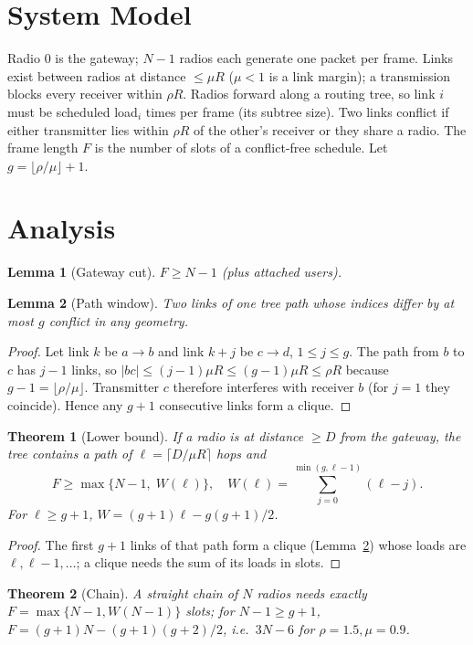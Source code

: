 \IfFileExists{IEEEtran.cls}{\documentclass[journal]{IEEEtran}}{\documentclass[10pt,twocolumn]{article}\usepackage[margin=0.75in]{geometry}\newcommand{\IEEEkeywords}{\textbf{Index Terms---}}}
\newtheorem{theorem}{Theorem}\newtheorem{lemma}{Lemma}
\begin{document}
\section{System Model}
Radio 0 is the gateway; $N-1$ radios each generate one packet per frame. Links exist between radios at distance $\le\mu R$ ($\mu<1$ is a link margin); a transmission blocks every receiver within $\rho R$. Radios forward along a routing tree, so link $i$ must be scheduled load$_i$ times per frame (its subtree size). Two links conflict if either transmitter lies within $\rho R$ of the other's receiver or they share a radio. The frame length $F$ is the number of slots of a conflict-free schedule. Let $g=\lfloor\rho/\mu\rfloor+1$.

\section{Analysis}
\begin{lemma}[Gateway cut] $F\ge N-1$ (plus attached users).\end{lemma}
\begin{lemma}[Path window]\label{lem:win} Two links of one tree path whose indices differ by at most $g$ conflict in any geometry.\end{lemma}
\begin{proof}Let link $k$ be $a\to b$ and link $k+j$ be $c\to d$, $1\le j\le g$. The path from $b$ to $c$ has $j-1$ links, so $|bc|\le(j-1)\mu R\le(g-1)\mu R\le\rho R$ because $g-1=\lfloor\rho/\mu\rfloor$. Transmitter $c$ therefore interferes with receiver $b$ (for $j=1$ they coincide). Hence any $g+1$ consecutive links form a clique.\end{proof}
\begin{theorem}[Lower bound]\label{thm:lb} If a radio is at distance $\ge D$ from the gateway, the tree contains a path of $\ell=\lceil D/\mu R\rceil$ hops and
\begin{equation}F\ge\max\{N-1,\;W(\ell)\},\quad W(\ell)=\sum_{j=0}^{\min(g,\ell-1)}(\ell-j).\end{equation}
For $\ell\ge g+1$, $W=(g+1)\ell-g(g+1)/2$.\end{theorem}
\begin{proof}The first $g+1$ links of that path form a clique (Lemma~\ref{lem:win}) whose loads are $\ell,\ell-1,\dots$; a clique needs the sum of its loads in slots.\end{proof}
\begin{theorem}[Chain]A straight chain of $N$ radios needs exactly $F=\max\{N-1,W(N-1)\}$ slots; for $N-1\ge g+1$, $F=(g+1)N-(g+1)(g+2)/2$, i.e.\ $3N-6$ for $\rho=1.5,\mu=0.9$.\end{theorem}
\end{document}
